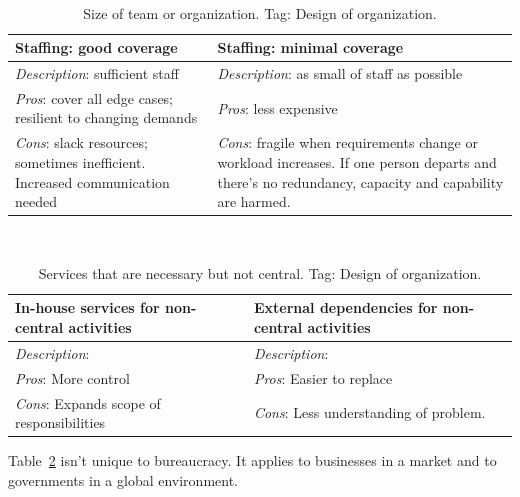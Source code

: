 \ \\

\begin{center}
\begin{table}[ht]
\begin{tabular}{ | m{\dilemmatablewidth}| m{\dilemmatablewidth} | } 
  \hline
  \textbf{Staffing: good coverage} &
  \textbf{Staffing: minimal coverage} \\
  \hline
  \textit{Description}: sufficient staff &
  \textit{Description}: as small of staff as possible \\  
  \hline
  \textit{Pros}: cover all edge cases; resilient to changing demands &
  \textit{Pros}: less expensive \\
  \hline
  \textit{Cons}: slack resources; sometimes inefficient. Increased communication needed & 
  \textit{Cons}: fragile when requirements change or workload increases. If one person departs and there's no redundancy, capacity and capability are harmed.  \\
  \hline
\end{tabular}
\caption{Size of team or organization.
{\tiny Tag: Design of organization.}
}
\label{table:staff_many-vs-few}
\end{table}
\end{center}


\ \\

\begin{center}
\begin{table}[ht]
\begin{tabular}{ | m{\dilemmatablewidth}| m{\dilemmatablewidth} | } 
  \hline
  \textbf{In-house services for non-central activities } &
  \textbf{External dependencies for non-central activities} \\
  \hline
  \textit{Description}:  &
  \textit{Description}:  \\  
  \hline
  \textit{Pros}: More control &
  \textit{Pros}: Easier to replace \\
  \hline
  \textit{Cons}: Expands scope of responsibilities & 
  \textit{Cons}: Less understanding of problem.  \\
  \hline
\end{tabular}
\caption{Services that are necessary but not central.
{\tiny Tag: Design of organization.}
}
\label{table:inhouse-vs-external}
\end{table}
\end{center}

Table~\ref{table:inhouse-vs-external} isn't unique to bureaucracy. It applies to businesses in a market and to governments in a global environment. 

